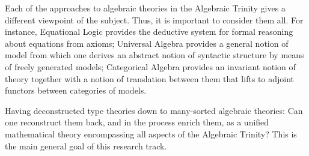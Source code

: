 \documentclass[11pt,twocolumn]{article}
\begin{document}
Each of the approaches to algebraic theories in the Algebraic Trinity gives a
different viewpoint of the subject.  Thus, it is important to consider them
all.  For instance, Equational Logic provides the deductive system for formal
reasoning about equations from axioms; Universal Algebra provides a general
notion of model from which one derives an abstract notion of syntactic
structure by means of freely generated models; Categorical Algebra provides an
invariant notion of theory together with a notion of translation between them
that lifts to adjoint functors between categories of models.

Having deconstructed type theories down to many-sorted algebraic theories:
Can one reconstruct them back, and in the process enrich them, as a unified
mathematical theory encompassing all aspects of the Algebraic Trinity?  This
is the main general goal of this research track.
\end{document}
